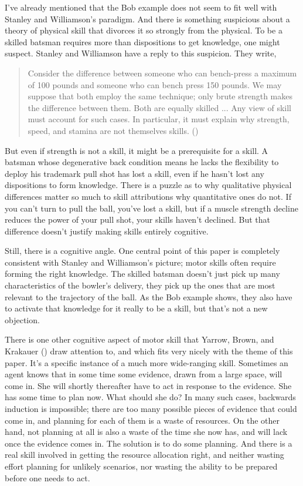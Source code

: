 \documentclass[
  10pt,
  letterpaper,
  DIV=11,
  numbers=noendperiod,
  twoside]{scrartcl}
\begin{document}
I've already mentioned that the Bob example does not seem to fit well
with Stanley and Williamson's paradigm. And there is something
suspicious about a theory of physical skill that divorces it so strongly
from the physical. To be a skilled batsman requires more than
dispositions to get knowledge, one might suspect. Stanley and Williamson
have a reply to this suspicion. They write,

\begin{quote}
Consider the difference between someone who can bench-press a maximum of
100 pounds and someone who can bench press 150 pounds. We may suppose
that both employ the same technique; only brute strength makes the
difference between them. Both are equally skilled ... Any view of skill
must account for such cases. In particular, it must explain why
strength, speed, and stamina are not themselves skills.
()
\end{quote}

But even if strength is not a skill, it might be a prerequisite for a
skill. A batsman whose degenerative back condition means he lacks the
flexibility to deploy his trademark pull shot has lost a skill, even if
he hasn't lost any dispositions to form knowledge. There is a puzzle as
to why qualitative physical differences matter so much to skill
attributions why quantitative ones do not. If you can't turn to pull the
ball, you've lost a skill, but if a muscle strength decline reduces the
power of your pull shot, your skills haven't declined. But that
difference doesn't justify making skills entirely cognitive.

Still, there is a cognitive angle. One central point of this paper is
completely consistent with Stanley and Williamson's picture; motor
skills often require forming the right knowledge. The skilled batsman
doesn't just pick up many characteristics of the bowler's delivery, they
pick up the ones that are most relevant to the trajectory of the ball.
As the Bob example shows, they also have to activate that knowledge for
it really to be a skill, but that's not a new objection.

There is one other cognitive aspect of motor skill that Yarrow, Brown,
and Krakauer () draw attention to, and
which fits very nicely with the theme of this paper. It's a specific
instance of a much more wide-ranging skill. Sometimes an agent knows
that in some time some evidence, drawn from a large space, will come in.
She will shortly thereafter have to act in response to the evidence. She
has some time to plan now. What should she do? In many such cases,
backwards induction is impossible; there are too many possible pieces of
evidence that could come in, and planning for each of them is a waste of
resources. On the other hand, not planning at all is also a waste of the
time she now has, and will lack once the evidence comes in. The solution
is to do some planning. And there is a real skill involved in getting
the resource allocation right, and neither wasting effort planning for
unlikely scenarios, nor wasting the ability to be prepared before one
needs to act.
\end{document}
